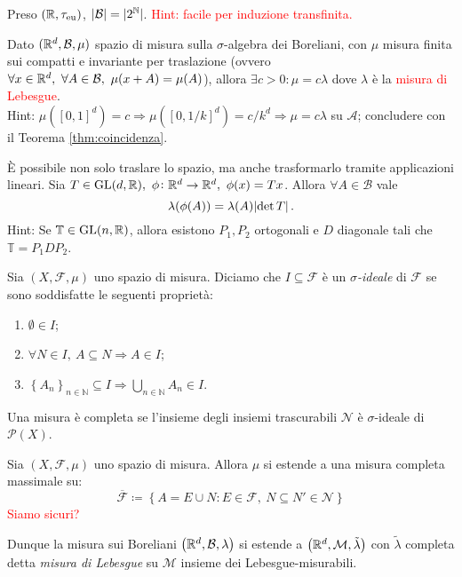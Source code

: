 \begin{exercise}
	Preso $ (\mathbb{R},\tau_{\text{eu}}) $, $\left|\mathcal{B}\right| = |2^{\mathbb{N}}| $.
	\textcolor{red}{Hint: facile per induzione transfinita.}
\end{exercise} 
\begin{exercise}
	Dato $(\mathbb{R}^d, \mathcal{B}, \mu)$ spazio di misura sulla $\sigma$-algebra dei Boreliani, con $\mu$ misura finita sui compatti e invariante per traslazione (ovvero $\forall x \in \R^d, \ \forall A \in \mathcal{B}, \ \mu(x+A)=\mu(A)$), allora $\exists c > 0 : \mu=c\lambda$ dove $\lambda$ è la \textcolor{red}{misura di Lebesgue}. \\
    Hint: $\mu ([0,1]^d)=c \Rightarrow \mu ([0, 1/k]^d) = c/k^d \Rightarrow \mu = c\lambda$ su $\mathcal{A}$; concludere con il Teorema \ref{thm:coincidenza}.
\end{exercise}
\begin{exercise}
	È possibile non solo traslare lo spazio, ma anche trasformarlo tramite applicazioni lineari. Sia $T\in\mathrm{GL}(d,\R),\ \phi\colon\R^d \to \R^d,\ \phi(x)=Tx$. Allora $\forall A \in \mathcal{B}$ vale
    \[
        \lambda(\phi(A))=\lambda(A)\abs{\det T}. 
    \]
	Hint: Se $\mathbb{T} \in \mathrm{GL}(n,\mathbb{R})$, allora esistono $P_1, P_2$ ortogonali e $D$ diagonale tali che $\mathbb{T}=P_1DP_2$.
\end{exercise}

\begin{definition}
	Sia $ (X,\mathcal{F},\mu) $ uno spazio di misura. Diciamo che $ I\subseteq\mathcal{F} $ è un \emph{$ \sigma $-ideale} di $ \mathcal{F} $ se sono soddisfatte le seguenti proprietà:
	\begin{enumerate}[label=(\roman*)]
		\item $ \emptyset\in I $;
		\item $ \forall N\in I,\ A\subseteq N \Rightarrow A \in I $;
		\item $ \left\{A_n \right\}_{n\in\mathbb{N}} \subseteq I \Rightarrow \bigcup\limits_{n\in\mathbb{N}} A_n\in I $.
	\end{enumerate}
\end{definition}

\begin{definition}
	Una misura è completa se l'insieme degli insiemi trascurabili $ \mathscr{N} $ è $ \sigma $-ideale di $ \mathscr{P}(X) $.
\end{definition}

\begin{thm}
	Sia $ (X,\mathcal{F},\mu) $ uno spazio di misura. Allora $ \mu $ si estende a una misura completa massimale su:
	\[ \overline{\mathcal{F}} \coloneqq \left\{ A = E \cup N : E\in \mathcal{F},\ N\subseteq N' \in \mathscr{N} \right\} \]
	\textcolor{red}{Siamo sicuri?}
\end{thm}
Dunque la misura sui Boreliani $\big(\mathbb{R}^d, \mathcal{B}, \lambda\big)$ si estende a $\big(\mathbb{R}^d, \mathcal{M}, \tilde\lambda \big)$ con $\tilde\lambda$ completa detta \emph{misura di Lebesgue} su \(\mathcal{M}\) insieme dei Lebesgue-misurabili.


